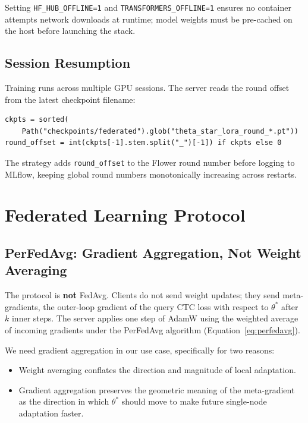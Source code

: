 \documentclass[12pt]{article}
\theoremstyle{plain}
\begin{document}
Setting \verb|HF_HUB_OFFLINE=1| and \verb|TRANSFORMERS_OFFLINE=1| ensures
no container attempts network downloads at runtime; model weights must be
pre-cached on the host before launching the stack.

\subsection{Session Resumption}

Training runs across multiple GPU sessions.
The server reads the round offset from the latest checkpoint filename:

\begin{verbatim}
ckpts = sorted(
    Path("checkpoints/federated").glob("theta_star_lora_round_*.pt"))
round_offset = int(ckpts[-1].stem.split("_")[-1]) if ckpts else 0
\end{verbatim}

The strategy adds \verb|round_offset| to the Flower round number before
logging to MLflow, keeping global round numbers monotonically increasing
across restarts.

\section{Federated Learning Protocol}
\label{sec:protocol}

\subsection{PerFedAvg: Gradient Aggregation, Not Weight Averaging}

The protocol is \textbf{not} FedAvg.
Clients do not send weight updates; they send meta-gradients, the outer-loop
gradient of the query CTC loss with respect to $\theta^*$ after $k$ inner steps.
The server applies one step of AdamW using the weighted average of incoming
gradients under the PerFedAvg algorithm (Equation~\ref{eq:perfedavg}).

We need gradient aggregation in our use case, specifically for two reasons:
\begin{itemize}
  \item Weight averaging conflates the direction and magnitude of local adaptation.
  \item Gradient aggregation preserves the geometric meaning of the meta-gradient
        as the direction in which $\theta^*$ should move to make future single-node
        adaptation faster.
\end{itemize}
\end{document}

